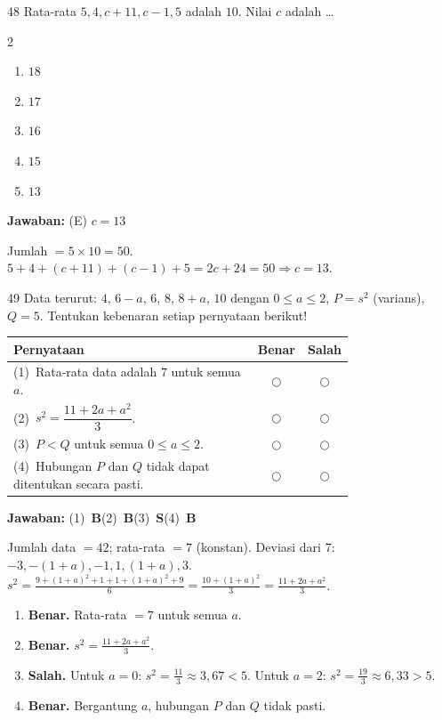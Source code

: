 \documentclass[11pt]{article}
\newcommand{\jawaban}[1]{%
  \noindent\colorbox{gold!30}{\parbox{\dimexpr\linewidth-2\fboxsep\relax}{%
    \textbf{Jawaban:} #1}}\par\smallskip}
\newenvironment{pilB}{%
  \par\smallskip\begin{multicols}{2}
  \begin{enumerate}[label=(\Alph*),leftmargin=*,itemsep=1pt,topsep=3pt]}%
  {\end{enumerate}\end{multicols}}
\begin{document}
\begin{soal}{48}
Rata-rata $5,4,c+11,c-1,5$ adalah $10$. Nilai $c$ adalah \ldots
\begin{pilB}\item $18$\item $17$\item $16$\item $15$\item $13$\end{pilB}
\end{soal}
\begin{pembox}
\jawaban{(E) $c=13$}
Jumlah $=5\times10=50$. $5+4+(c+11)+(c-1)+5=2c+24=50\Rightarrow c=13$.
\end{pembox}

\begin{soal}{49}
Data terurut: $4,\,6-a,\,6,\,8,\,8+a,\,10$ dengan $0\leq a\leq2$,
$P=s^2$ (varians), $Q=5$.
Tentukan kebenaran setiap pernyataan berikut!

\par\smallskip
{\renewcommand{\arraystretch}{1.4}%
\begin{tabular}{@{}p{0.76\linewidth}cc@{}}
\hline\textbf{Pernyataan}&\textbf{Benar}&\textbf{Salah}\\\hline
(1)~Rata-rata data adalah $7$ untuk semua $a$.&$\bigcirc$&$\bigcirc$\\
(2)~$s^2=\dfrac{11+2a+a^2}{3}$.&$\bigcirc$&$\bigcirc$\\
(3)~$P<Q$ untuk semua $0\leq a\leq2$.&$\bigcirc$&$\bigcirc$\\
(4)~Hubungan $P$ dan $Q$ tidak dapat ditentukan secara pasti.&$\bigcirc$&$\bigcirc$\\\hline
\end{tabular}}
\end{soal}
\begin{pembox}
\jawaban{(1)~\textbf{B}\quad(2)~\textbf{B}\quad(3)~\textbf{S}\quad(4)~\textbf{B}}
Jumlah data $=42$; rata-rata $=7$ (konstan). Deviasi dari 7: $-3,-(1+a),-1,1,(1+a),3$.
$s^2=\tfrac{9+(1+a)^2+1+1+(1+a)^2+9}{6}=\tfrac{10+(1+a)^2}{3}=\tfrac{11+2a+a^2}{3}$.
\begin{enumerate}[leftmargin=*,topsep=2pt,itemsep=2pt]
\item \textbf{Benar.} Rata-rata $=7$ untuk semua $a$.
\item \textbf{Benar.} $s^2=\tfrac{11+2a+a^2}{3}$.
\item \textbf{Salah.} Untuk $a=0$: $s^2=\tfrac{11}{3}\approx3{,}67<5$. Untuk $a=2$: $s^2=\tfrac{19}{3}\approx6{,}33>5$.
\item \textbf{Benar.} Bergantung $a$, hubungan $P$ dan $Q$ tidak pasti.
\end{enumerate}
\end{pembox}
\end{document}
